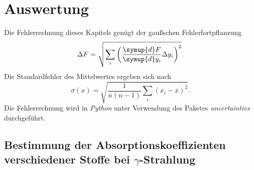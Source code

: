 \section{Auswertung}
\label{sec:Auswertung}
Die Fehlerrechnung dieses Kapitels genügt der gaußschen Fehlerfortpflanzung
\begin{equation*}
  \label{eqn:Gauss}
  \Delta F = \sqrt{\sum_i\left(\frac{\symup{d}F}{\symup{d}y_i}\Delta y_i \right)^2}.
\end{equation*}
Die Standardfehler des Mittelwertes ergeben sich nach
\begin{equation*}
  \label{eqn:MW-Fehler}
  \sigma(x) = \sqrt{\frac{1}{n(n-1)} \sum_i (x_i - \overline{x})^2}.
\end{equation*}
Die Fehlerrechnung wird in \textit{Python} unter Verwendung des Paketes \textit{uncertainties} \cite{uncertainties} durchgeführt.

\subsection{\texorpdfstring{Bestimmung der Absorptionskoeffizienten verschiedener Stoffe bei $\gamma$-Strahlung}
{Bestimmung der Absorptionskoeffizienten verschiedener Stoffe bei Gamma-Strahlung}}
\label{subsec:A_Koeffizienten}

